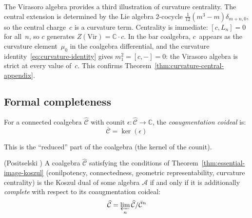 \begin{example}\label{ex:virasoro-central-charge-curvature}
The Virasoro algebra provides a third illustration of curvature
centrality.  The central extension is determined by the Lie algebra
$2$-cocycle $\frac{1}{12}(m^3 - m)\delta_{m+n,0}$, so the central
charge~$c$ is a curvature term.  Centrality is immediate: $[c, L_n] = 0$
for all~$n$, so $c$ generates $Z(\mathrm{Vir}) = \mathbb{C} \cdot c$.
In the bar coalgebra, $c$~appears as the curvature element~$\mu_0$ in
the coalgebra differential, and the curvature
identity~\eqref{eq:curvature-identity} gives $m_1^2 = [c, -] = 0$:
the Virasoro algebra is strict at every value of~$c$.
This confirms Theorem~\ref{thm:curvature-central-appendix}.
\end{example}

\subsection{Formal completeness}

\begin{definition}\label{def:coaugmentation-coideal}
For a connected coalgebra $\widehat{\mathcal{C}}$ with counit $\epsilon: \widehat{\mathcal{C}} 
\to \mathbb{C}$, the \emph{coaugmentation coideal} is:
\[\bar{\mathcal{C}} = \ker(\epsilon)\]

This is the ``reduced'' part of the coalgebra (the kernel of the counit).
\end{definition}

\begin{theorem}\label{thm:completion-characterization}
\textup{(Positselski \cite{Positselski11})}
A coalgebra $\widehat{\mathcal{C}}$ satisfying the conditions of Theorem~\ref{thm:essential-image-koszul} (conilpotency, connectedness, geometric representability, curvature centrality) is the Koszul dual of some algebra $\mathcal{A}$ if and only if it is additionally \emph{complete} with respect to its coaugmentation coideal:
\[\widehat{\mathcal{C}} = \varprojlim_n \widehat{\mathcal{C}} / \bar{\mathcal{C}}^n\]
\end{theorem}

